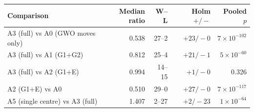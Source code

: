 \begin{tabular}{lrrrr}
\toprule
Comparison & Median ratio & W--L & Holm $+/-$ & Pooled $p$ \\
\midrule
A3 (full) vs A0 (GWO moves only) & 0.538 & 27--2 & $+23/-0$ & $7\times10^{-102}$ \\
A3 (full) vs A1 (G1$+$G2) & 0.812 & 25--4 & $+21/-1$ & $5\times10^{-60}$ \\
A3 (full) vs A2 (G1$+$E) & 0.994 & 14--15 & $+1/-0$ & 0.326 \\
A2 (G1$+$E) vs A0 & 0.510 & 29--0 & $+27/-0$ & $7\times10^{-117}$ \\
A5 (single centre) vs A3 (full) & 1.407 & 2--27 & $+2/-23$ & $1\times10^{-64}$ \\
\bottomrule
\end{tabular}

